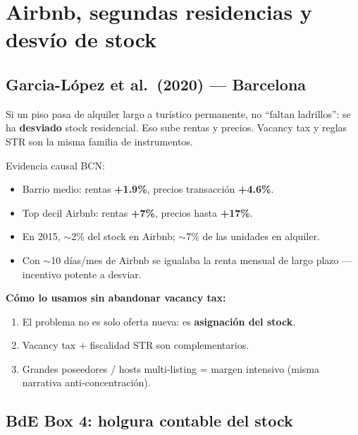 \documentclass[11pt,a4paper]{report}
\begin{document}
\chapter{Airbnb, segundas residencias y desv\'io de stock}
\label{ch:airbnb}

\section{Garcia-L\'opez et al.\ (2020) --- Barcelona}

\begin{intuicion}
Si un piso pasa de alquiler largo a tur\'istico permanente, no ``faltan
ladrillos'': se ha \textbf{desviado} stock residencial. Eso sube rentas y precios.
Vacancy tax y reglas STR son la misma familia de instrumentos.
\end{intuicion}

\begin{dato}
Evidencia causal BCN:
\begin{itemize}
  \item Barrio medio: rentas \textbf{+1.9\%}, precios transacci\'on \textbf{+4.6\%}.
  \item Top decil Airbnb: rentas \textbf{+7\%}, precios hasta \textbf{+17\%}.
  \item En 2015, $\sim$2\% del stock en Airbnb; $\sim$7\% de las unidades en alquiler.
  \item Con $\sim$10 d\'ias/mes de Airbnb se igualaba la renta mensual de largo plazo
        --- incentivo potente a desviar.
\end{itemize}
\end{dato}

\textbf{C\'omo lo usamos sin abandonar vacancy tax:}
\begin{enumerate}
  \item El problema no es solo oferta nueva: es \textbf{asignaci\'on del stock}.
  \item Vacancy tax + fiscalidad STR son complementarios.
  \item Grandes poseedores / hosts multi-listing = margen intensivo
        (misma narrativa anti-concentraci\'on).
\end{enumerate}

\section{BdE Box 4: holgura contable del stock}
\end{document}
